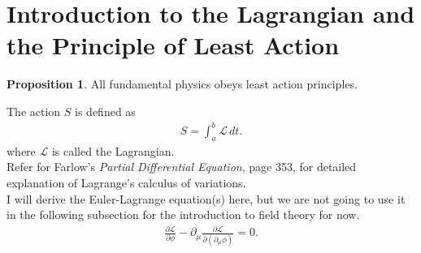 \documentclass[a4paper,11pt]{article}
\numberwithin{equation}{section}
\theoremstyle{definition}
\newtheorem{prop}{Proposition}[section]
\begin{document}
\newpage

\tableofcontents

\newpage
\section{Introduction to the Lagrangian and the Principle of Least Action}
\begin{prop}
	All fundamental physics obeys least action principles.
\end{prop}
The action $S$ is defined as
\begin{align*}
S = \int_{a}^{b}\mathcal{L}\,dt.
\end{align*}
where $\mathcal{L}$ is called the Lagrangian.\\

Refer for Farlow's \textit{Partial Differential Equation}, page 353, for detailed explanation of Lagrange's calculus of variations.\\

I will derive the Euler-Lagrange equation(s) here, but we are not going to use it in the following subsection for the introduction to field theory for now. \\
\begin{align*}
\frac{\partial \mathcal{L}}{\partial \phi} - \partial_\mu\frac{\partial \mathcal{L}}{\partial(\partial_\mu \phi)} = 0.
\end{align*}
\end{document}
